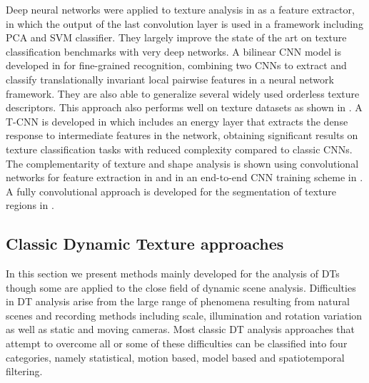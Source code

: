 \documentclass[a4paper,11pt]{article}
\begin{document}
Deep neural networks were applied to texture analysis in \cite{cimpoi2014deep} as a feature extractor,
in which the output of the last convolution layer is used in a framework including PCA and SVM classifier. They largely improve the state of the art on texture classification benchmarks with very deep networks.
A bilinear CNN model is developed in \cite{lin2015bilinear} for fine-grained recognition, combining two CNNs to extract and classify translationally invariant local pairwise features in a neural network framework.
They are also able to generalize several widely used orderless texture descriptors. This approach also performs well on texture datasets as shown in \cite{lin2015visualizing}.
A T-CNN is developed in \cite{andrearczyk2016using} which includes an energy layer that extracts the dense response to intermediate features in the network, obtaining significant results on texture classification tasks with reduced complexity compared to classic CNNs.
The complementarity of texture and shape analysis is shown using convolutional networks for feature extraction in \cite{cimpoi2014deep} and in an end-to-end CNN training scheme in \cite{andrearczyk2016using}.
A fully convolutional approach is developed for the segmentation of texture regions in \cite{andrearczyk2017texture}.

\subsection{Classic Dynamic Texture approaches}
In this section we present methods mainly developed for the analysis of DTs though some are applied to the close field of dynamic scene analysis.
Difficulties in DT analysis arise from the large range of phenomena resulting from natural scenes and recording methods including scale, illumination and rotation variation as well as static and moving cameras.
Most classic DT analysis approaches that attempt to overcome all or some of these difficulties can be classified into four categories, namely statistical, motion based, model based and spatiotemporal filtering.
\end{document}
